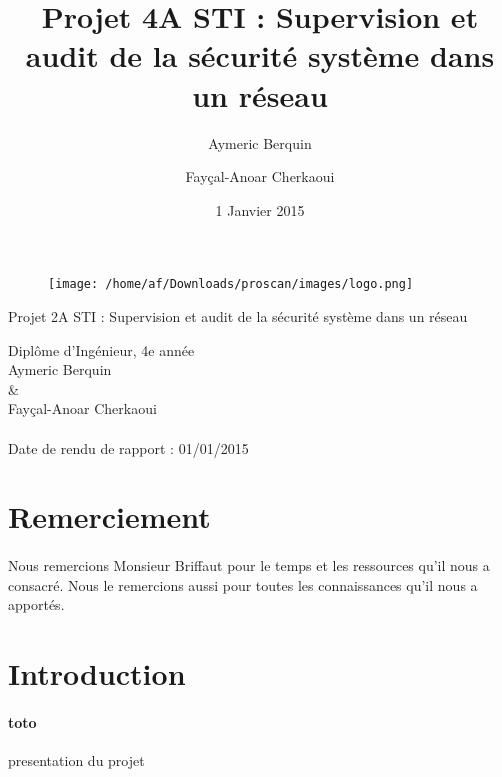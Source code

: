 \documentclass[11pt,a4paper,titlepage, oneside]{article}
\title{Projet 4A STI : Supervision et audit de la sécurité système dans un réseau}
\author{Aymeric Berquin \and Fayçal-Anoar Cherkaoui}
\date{1 Janvier 2015}
\begin{document}
\begin{titlepage}
 \thispagestyle{empty}
\begin{figure}[h]
  \centering
  \texttt{[image: /home/af/Downloads/proscan/images/logo.png]}
\end{figure}
\vspace{0,5cm}
\begin{center} 
\Huge{\textbf{{\color{red}}}Projet 2A STI : Supervision et audit de la sécurité système dans un réseau}
\\
\vspace{1.5 cm}

\vspace{1cm}
\large{Diplôme d'Ingénieur, 4e année}
\\
\vspace{1cm}
\large{Aymeric Berquin \\ \& \\ Fayçal-Anoar Cherkaoui}
\vspace{1 cm}
\paragraph{}
	\Large{Date de rendu de rapport : 01/01/2015}
	\\
	
\vspace{1.5 cm}
\end{center} 
\end{titlepage} 
\normalsize
\newpage
\section*{\textbf{Remerciement}}
\thispagestyle{empty}
	\paragraph{}
	Nous remercions Monsieur Briffaut pour le temps et les ressources qu'il nous a consacré. Nous le remercions aussi pour toutes les connaissances qu'il nous a apportés.

\newpage
\section*{{\color{red}Introduction}}
	\paragraph{toto}
		presentation du projet
		
\end{document}
